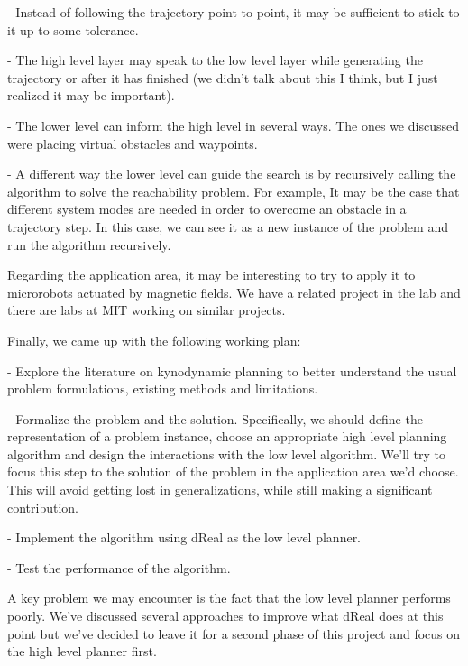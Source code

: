 \documentclass[12pt]{article}
\begin{document}
- Instead of following the trajectory point to point, it may be sufficient to stick to it up to some tolerance.

- The high level layer may speak to the low level layer while generating the trajectory or after it has finished (we didn't talk about this I think, but I just realized it may be important).

- The lower level can inform the high level in several ways. The ones we discussed were placing virtual obstacles and waypoints.

- A different way the lower level can guide the search is by recursively calling the algorithm to solve the reachability problem. For example, It may be the case that different system modes are needed in order to overcome an obstacle in a trajectory step. In this case, we can see it as a new instance of the problem and run the algorithm recursively.

Regarding the application area, it may be interesting to try to apply it to microrobots actuated by magnetic fields. We have a related project in the lab and there are labs at MIT working on similar projects.

Finally, we came up with the following working plan:

- Explore the literature on kynodynamic planning to better understand the usual problem formulations, existing methods and limitations.

- Formalize the problem and the solution. Specifically, we should define the representation of a problem instance, choose an appropriate high level planning algorithm and design the interactions with the low level algorithm. We'll try to focus this step to the solution of the problem in the application area we'd choose. This will avoid getting lost in generalizations, while still making a significant contribution.

- Implement the algorithm using dReal as the low level planner.

- Test the performance of the algorithm.

A key problem we may encounter is the fact that the low level planner performs poorly. We've discussed several approaches to improve what dReal does at this point but we've decided to leave it for a second phase of this project and focus on the high level planner first.
\fi
\end{document}
